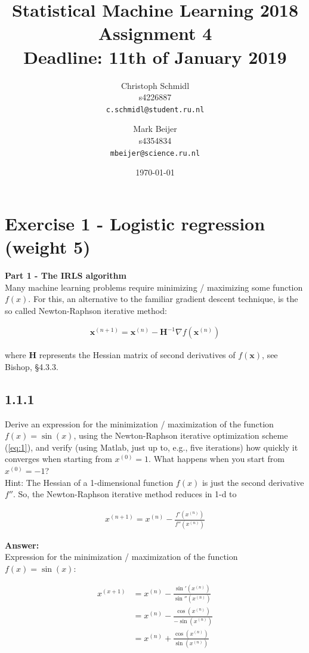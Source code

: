 \documentclass[a4paper]{article}
\title{Statistical Machine Learning 2018\\Assignment 4\\Deadline: 11th of January 2019}
\author{
  Christoph Schmidl\\ s4226887\\      \texttt{c.schmidl@student.ru.nl}
  \and
  Mark Beijer\\ s4354834\\     \texttt{mbeijer@science.ru.nl}
}
\date{\today}
\begin{document}
\maketitle


\section*{Exercise 1 - Logistic regression (weight 5)}

\textbf{Part 1 - The IRLS algorithm}\\

Many machine learning problems require minimizing / maximizing some function $f(x)$. For this, an alternative to the familiar gradient descent technique, is the so called Newton-Raphson iterative method:

\begin{eqnarray} \label{eq:1}
\textbf{x}^{(n+1)} = \textbf{x}^{(n)} - \textbf{H}^{-1} \nabla f(\textbf{x}^{(n)})
\end{eqnarray}

where \textbf{H} represents the Hessian matrix of second derivatives of $f(\textbf{x})$, see Bishop, §4.3.3.

\subsection*{1.1.1}

Derive an expression for the minimization / maximization of the function $f(x) = \sin(x)$, using the Newton-Raphson iterative optimization scheme (\ref{eq:1}), and verify (using Matlab, just up to, e.g., five iterations) how quickly it converges when starting from $x^{(0)} = 1$. What happens when you start from $x^{(0)} = -1$?\\
Hint: The Hessian of a 1-dimensional function $f(x)$ is just the second derivative $f''$. So, the Newton-Raphson iterative method reduces in 1-d to 

\begin{eqnarray}  \label{eq:2}
x^{(n+1)} = x^{(n)} - \frac{f'(x^{(n)})}{f''(x^{(n)})}
\end{eqnarray}


\textbf{Answer:}\\

Expression for the minimization / maximization of the function $f(x) = \sin(x)$:

\begin{align*}
x^{(x+1)} &= x^{(n)} - \frac{\sin'(x^{(n)})}{\sin''(x^{(n)})}\\
&=  x^{(n)} - \frac{\cos(x^{(n)})}{-\sin(x^{(n)})}\\
&=  x^{(n)} + \frac{\cos(x^{(n)})}{\sin(x^{(n)})}\\
\end{align*}
\end{document}
